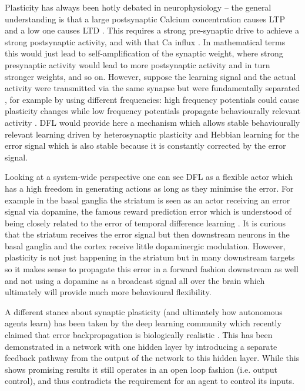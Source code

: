 \documentclass{aamas2018}
\begin{document}
Plasticity has always been hotly debated in neurophysiology -- the
general understanding is that a large postsynaptic Calcium
concentration causes LTP \cite{Malenka99,Bennett2000} and a low one
causes LTD \cite{Mulkey1992}. This requires a strong pre-synaptic
drive to achieve a strong postsynaptic activity, and with that Ca
influx \cite{Meunier2017}. In mathematical terms this would just lead
to self-amplification of the synaptic weight, where strong presynaptic
activity would lead to more postsynaptic activity and in turn stronger
weights, and so on. However, suppose the learning signal and the
actual activity were transmitted via the same synapse but were
fundamentally separated \cite{Lindsay2017}, for example by using
different frequencies: high frequency potentials could cause
plasticity changes while low frequency potentials propagate
behaviourally relevant activity \cite{Canolty2010}. DFL would provide
here a mechanism which allows stable behaviourally relevant learning
driven by heterosynaptic plasticity and Hebbian learning for the error
signal which is also stable because it is constantly corrected by the
error signal.

Looking at a system-wide perspective one can see DFL as a flexible
actor which has a high freedom in generating actions as long as they
minimise the error. For example in the basal ganglia the striatum is
seen as an actor receiving an error signal via dopamine, the famous
reward prediction error which is understood of being closely related
to the error of temporal difference learning
\cite{gurney98:_basal_gangl_action_selec_devic}. It is curious that
the striatum receives the error signal but then downstream neurons in
the basal ganglia and the cortex receive little dopaminergic
modulation. However, plasticity is not just happening in the striatum
but in many downstream targets so it makes sense to propagate this
error in a forward fashion downstream as well and not using a dopamine
as a broadcast signal all over the brain which ultimately will provide
much more behavioural flexibility.

A different stance about synaptic plasticity (and ultimately how
autonomous agents learn) has been taken by the deep learning community
which recently claimed that error backpropagation is biologically
realistic \cite{Lillicrap2016,Roelfsema2018}. This has been
demonstrated in a network with one hidden layer by introducing a
separate feedback pathway from the output of the network to this
hidden layer. While this shows promising results it still operates in
an open loop fashion (i.e. output control), and thus contradicts the
requirement for an agent to control its inputs.
\end{document}
